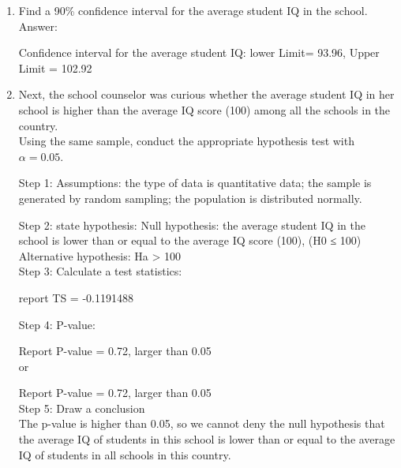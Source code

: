 \documentclass[12pt,letterpaper]{article}
\begin{document}
\begin{enumerate}
	\item Find a 90\% confidence interval for the average student IQ in the school.\\
	
	Answer:
	
	
	Confidence interval for the average student IQ: lower Limit= 93.96, Upper Limit = 102.92
	
	\item Next, the school counselor was curious  whether  the average student IQ in her school is higher than the average IQ score (100) among all the schools in the country.\\ 
	
	
	\noindent Using the same sample, conduct the appropriate hypothesis test with $\alpha=0.05$.
	
	Step 1: Assumptions: 
	        the type of data is quantitative data; the sample is generated by random sampling; the population is distributed normally.  
	           
	Step 2: state hypothesis:  
	        Null hypothesis: the average student IQ in the school is lower than or equal to the average IQ score (100), (H0 ≤ 100) \\
	        Alternative hypothesis: Ha > 100   \\
	        
	Step 3: Calculate a test statistics:
	 
	        
	        report TS = -0.1191488 
	        
	Step 4: P-value: 
	        
	        Report P-value = 0.72, larger than  0.05 \\
	        or
	        
	         Report P-value = 0.72, larger than 0.05 \\         
    Step 5: Draw a conclusion \\     
	        The p-value is higher than 0.05, so we cannot deny the null hypothesis that the average IQ of students in this school is lower than or equal to the average IQ of students in all schools in this country.
	        
	
	
	
	
	
\end{enumerate}
\end{document}
